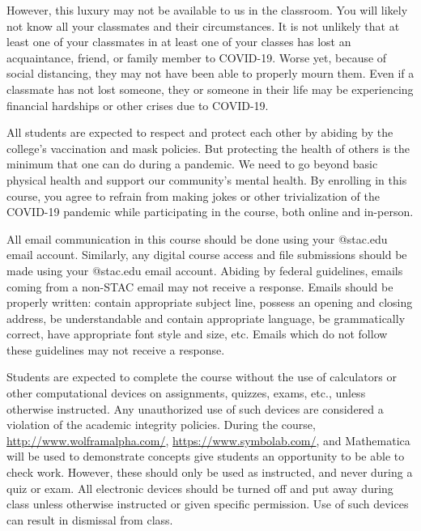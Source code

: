 \documentclass[11pt,letterpaper]{article}
\begin{document}
However, this luxury may not be available to us in the classroom. You will likely not know all your classmates and their circumstances. It is not unlikely that at least one of your classmates in at least one of your classes has lost an acquaintance, friend, or family member to COVID-19. Worse yet, because of social distancing, they may not have been able to properly mourn them. Even if a classmate has not lost someone, they or someone in their life may be experiencing financial hardships or other crises due to COVID-19. \pspace

All students are expected to respect and protect each other by abiding by the college's vaccination and mask policies. But protecting the health of others is the minimum that one can do during a pandemic. We need to go beyond basic physical health and support our community's mental health. By enrolling in this course, you agree to refrain from making jokes or other trivialization of the COVID-19 pandemic while participating in the course, both online and in-person.
\sectionbreak



All email communication in this course should be done using your @stac.edu email account. Similarly, any digital course access and file submissions should be made using your @stac.edu email account. Abiding by federal guidelines, emails coming from a non-STAC email may not receive a response. Emails should be properly written: contain appropriate subject line, possess an opening and closing address, be understandable and contain appropriate language, be grammatically correct, have appropriate font style and size, etc. Emails which do not follow these guidelines may not receive a response.
\sectionbreak



Students are expected to complete the course without the use of calculators or other computational devices on assignments, quizzes, exams, etc., unless otherwise instructed. Any unauthorized use of such devices are considered a violation of the academic integrity policies. During the course, \href{http://www.wolframalpha.com/}{http://www.wolframalpha.com/}, \href{https://www.symbolab.com/}{https://www.symbolab.com/}, and Mathematica will be used to demonstrate concepts give students an opportunity to be able to check work. However, these should only be used as instructed, and never during a quiz or exam. All electronic devices should be turned off and put away during class unless otherwise instructed or given specific permission. Use of such devices can result in dismissal from class.
\sectionbreak
\end{document}
